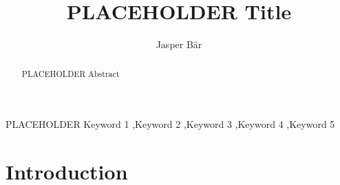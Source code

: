 \documentclass[review]{elsarticle}
\begin{document}
\begin{frontmatter}

\title{PLACEHOLDER Title}

\author {Jasper Bär}


\begin{abstract}
PLACEHOLDER Abstract
\end{abstract}

\begin{keyword}
PLACEHOLDER Keyword 1 \sep Keyword 2 \sep Keyword 3 \sep Keyword 4 \sep Keyword 5
\end{keyword}


\end{frontmatter}


\section{Introduction} \label{sec:intro}
\end{document}
